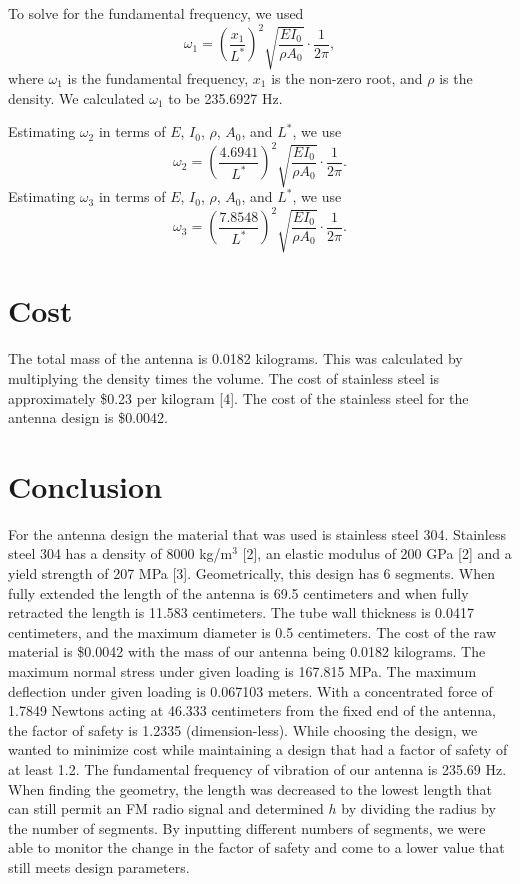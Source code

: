 \documentclass[12pt]{article}
\begin{document}
To solve for the fundamental frequency, we used 
\begin{equation}\label{eq:FundamentalFrequency}
    \omega_1=(\frac{x_1}{L^*})^2\sqrt{\frac{EI_0}{\rho A_0}}\cdot\frac{1}{2\pi},
\end{equation}
where $\omega_1$ is the fundamental frequency, $x_1$ is the non-zero root, and $\rho$ is the density. We calculated $\omega_1$ to be 235.6927 Hz.

Estimating $\omega_2$ in terms of $E$, $I_0$, $\rho$, $A_0$, and $L^*$, we use
\begin{equation}\label{eq:NaturalFrequency2}
    \omega_2=(\frac{4.6941}{L^*})^2\sqrt{\frac{EI_0}{\rho A_0}}\cdot\frac{1}{2\pi}.
\end{equation}
Estimating $\omega_3$ in terms of $E$, $I_0$, $\rho$, $A_0$, and $L^*$, we use
\begin{equation}\label{eq:NaturalFrequency2}
    \omega_3=(\frac{7.8548}{L^*})^2\sqrt{\frac{EI_0}{\rho A_0}}\cdot\frac{1}{2\pi}.
\end{equation}
\newpage
\section{Cost}
The total mass of the antenna is 0.0182 kilograms. This was calculated by multiplying the density times the volume. The cost of stainless steel is approximately \$0.23 per kilogram [4]. The cost of the stainless steel for the antenna design is \$0.0042.
\newpage

\section{Conclusion}
For the antenna design the material that was used is stainless steel 304. Stainless steel 304 has a density of 8000 kg/m$^3$ [2], an elastic modulus of 200 GPa [2] and a yield strength of 207 MPa [3]. Geometrically, this design has 6 segments. When fully extended the length of the antenna is 69.5 centimeters and when fully retracted the length is 11.583 centimeters. The tube wall thickness is 0.0417  centimeters, and the maximum diameter is 0.5 centimeters. The cost of the raw material is \$0.0042 with the mass of our antenna being 0.0182 kilograms. The maximum normal stress under given loading is 167.815 MPa. The maximum deflection under given loading is 0.067103 meters. With a concentrated force of 1.7849 Newtons acting at 46.333 centimeters from the fixed end of the antenna, the factor of safety is 1.2335 (dimension-less). While choosing the design, we wanted to minimize cost while maintaining a design that had a factor of safety of at least 1.2. The fundamental frequency of vibration of our antenna is 235.69 Hz. When finding the geometry, the length was decreased to the lowest length that can still permit an FM radio signal and determined $h$ by dividing the radius by the number of segments. By inputting different numbers of segments, we were able to monitor the change in the factor of safety and come to a lower value that still meets design parameters.
\newpage
\end{document}
